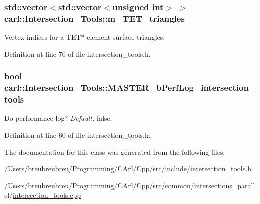 \subsubsection[{m\+\_\+\+T\+E\+T\+\_\+triangles}]{\setlength{\rightskip}{0pt plus 5cm}std\+::vector$<$std\+::vector$<$unsigned int$>$ $>$ carl\+::\+Intersection\+\_\+\+Tools\+::m\+\_\+\+T\+E\+T\+\_\+triangles\hspace{0.3cm}{\ttfamily [protected]}}\label{classcarl_1_1_intersection___tools_a54e026b256ab6894b1f77950a425b1eb}


Vertex indices for a T\+E\+T$\ast$ element surface triangles. 



Definition at line 70 of file intersection\+\_\+tools.\+h.

\hypertarget{classcarl_1_1_intersection___tools_a651c43f074c2955bd58ef0d519c6ef73}{}
\subsubsection[{M\+A\+S\+T\+E\+R\+\_\+b\+Perf\+Log\+\_\+intersection\+\_\+tools}]{\setlength{\rightskip}{0pt plus 5cm}bool carl\+::\+Intersection\+\_\+\+Tools\+::\+M\+A\+S\+T\+E\+R\+\_\+b\+Perf\+Log\+\_\+intersection\+\_\+tools\hspace{0.3cm}{\ttfamily [protected]}}\label{classcarl_1_1_intersection___tools_a651c43f074c2955bd58ef0d519c6ef73}


Do performance log? {\itshape Default\+:} false. 



Definition at line 60 of file intersection\+\_\+tools.\+h.



The documentation for this class was generated from the following files\+:\begin{DoxyCompactItemize}
\item 
/\+Users/breubreubreu/\+Programming/\+C\+Arl/\+Cpp/src/include/\hyperlink{intersection__tools_8h}{intersection\+\_\+tools.\+h}\item 
/\+Users/breubreubreu/\+Programming/\+C\+Arl/\+Cpp/src/common/intersections\+\_\+parallel/\hyperlink{intersection__tools_8cpp}{intersection\+\_\+tools.\+cpp}\end{DoxyCompactItemize}
